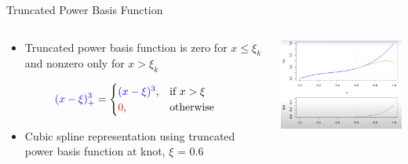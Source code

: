 \documentclass[english]{beamer}
\newcommand{\alertblue}[1]{{\color{blue}#1}}
\begin{document}
\begin{frame}{Truncated Power Basis Function}
 \begin{columns}
     \begin{column}{0.5\textwidth} 
         \begin{itemize}
             \item Truncated power basis function is \alertblue{zero} for \alertblue{\( x \leq \xi_k \)} and \alertblue{nonzero} only for \alertblue{\( x > \xi_k \)}
         \end{itemize}
         \begin{equation*}
             \alertblue{(x - \xi)^3_+} =
             \begin{cases}
                 \alertblue{(x - \xi)^3}, & \text{if } x > \xi \\
                 \textcolor{red}{0}, & \text{otherwise}
             \end{cases}
         \end{equation*}
         \begin{itemize}
             \item Cubic spline representation using truncated power basis function at \alertblue{knot, \(\xi\) = 0.6}
         \end{itemize}
     \end{column}
     \begin{column}{0.6\textwidth} 
         \centering
         \includegraphics[width=6.5cm,keepaspectratio]{images/truncated_cubic.png}
     \end{column}
 \end{columns}
\end{frame}
\end{document}
